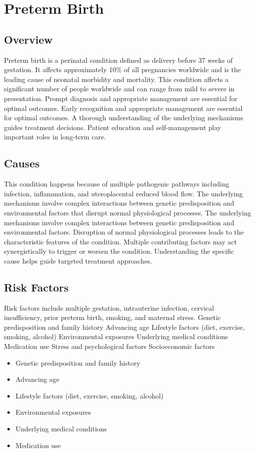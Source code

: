 \chapter{Preterm Birth}
\label{sec:Preterm Birth}

\section{Overview}
Preterm birth is a perinatal condition defined as delivery before 37 weeks of gestation. It affects approximately 10\% of all pregnancies worldwide and is the leading cause of neonatal morbidity and mortality. This condition affects a significant number of people worldwide and can range from mild to severe in presentation. Prompt diagnosis and appropriate management are essential for optimal outcomes. Early recognition and appropriate management are essential for optimal outcomes. A thorough understanding of the underlying mechanisms guides treatment decisions. Patient education and self-management play important roles in long-term care.
\section{Causes}
This condition happens because of multiple pathogenic pathways including infection, inflammation, and uteroplacental reduced blood flow. The underlying mechanisms involve complex interactions between genetic predisposition and environmental factors that disrupt normal physiological processes. The underlying mechanisms involve complex interactions between genetic predisposition and environmental factors. Disruption of normal physiological processes leads to the characteristic features of the condition. Multiple contributing factors may act synergistically to trigger or worsen the condition. Understanding the specific cause helps guide targeted treatment approaches.
\section{Risk Factors}
Risk factors include multiple gestation, intrauterine infection, cervical insufficiency, prior preterm birth, smoking, and maternal stress. Genetic predisposition and family history Advancing age Lifestyle factors (diet, exercise, smoking, alcohol) Environmental exposures Underlying medical conditions Medication use Stress and psychological factors Socioeconomic factors

\begin{itemize}[noitemsep]
  \item Genetic predisposition and family history
  \item Advancing age
  \item Lifestyle factors (diet, exercise, smoking, alcohol)
  \item Environmental exposures
  \item Underlying medical conditions
  \item Medication use
\end{itemize}
